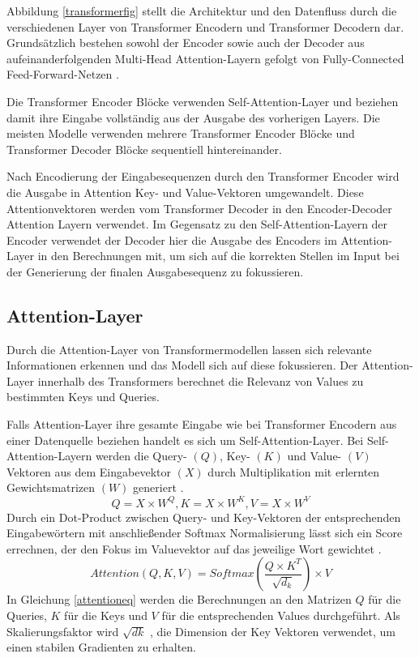 Abbildung \ref{transformerfig} stellt die Architektur und den Datenfluss durch die verschiedenen Layer von Transformer Encodern und Transformer Decodern dar. 
Grundsätzlich bestehen sowohl der Encoder sowie auch der Decoder aus aufeinanderfolgenden Multi-Head Attention-Layern gefolgt von Fully-Connected Feed-Forward-Netzen \citep{AttentionIALYN}.


Die Transformer Encoder Blöcke verwenden Self-Attention-Layer und beziehen damit ihre Eingabe vollständig aus der Ausgabe des vorherigen Layers. 
Die meisten Modelle verwenden mehrere Transformer Encoder Blöcke und Transformer Decoder Blöcke sequentiell hintereinander.

Nach Encodierung der Eingabesequenzen durch den Transformer Encoder wird die Ausgabe in Attention Key- und Value-Vektoren umgewandelt.
Diese Attentionvektoren werden vom Transformer Decoder in den Encoder-Decoder Attention Layern verwendet.
Im Gegensatz zu den Self-Attention-Layern der Encoder verwendet der Decoder hier die Ausgabe des Encoders im Attention-Layer in den Berechnungen mit, um sich auf die korrekten Stellen im Input bei der Generierung der finalen Ausgabesequenz zu fokussieren.






\subsection{Attention-Layer} %
\label{attention}
Durch die Attention-Layer von Transformermodellen lassen sich relevante Informationen erkennen und das Modell sich auf diese fokussieren. 
Der Attention-Layer innerhalb des Transformers berechnet die Relevanz von Values zu bestimmten Keys und Queries. 

Falls Attention-Layer ihre gesamte Eingabe wie bei Transformer Encodern aus einer Datenquelle beziehen handelt es sich um Self-Attention-Layer.
Bei Self-Attention-Layern werden die Query- $(Q)$, Key- $(K)$ und Value- $(V)$ Vektoren aus dem Eingabevektor $(X)$ durch Multiplikation mit erlernten Gewichtsmatrizen $(W)$ generiert \citep{AttentionIALYN}. 
\begin{equation}
    Q = X \times W^{Q}, K = X \times W^{K}, V = X \times W^{V}
\end{equation}
Durch ein Dot-Product zwischen Query- und Key-Vektoren der entsprechenden Eingabewörtern mit anschließender Softmax Normalisierung lässt sich ein Score errechnen, der den Fokus im Valuevektor auf das jeweilige Wort gewichtet \citep{AttentionIALYN}.
\begin{equation}
    \label{attentioneq}
    Attention(Q,K,V) = Softmax(\frac{Q\times K^T}{\sqrt{d_k}})\times V
\end{equation}
In Gleichung \ref{attentioneq} werden die Berechnungen an den Matrizen $Q$ für die Queries, $K$ für die Keys und $V$ für die entsprechenden Values durchgeführt. Als Skalierungsfaktor wird $\sqrt{dk}$ , die Dimension der Key Vektoren verwendet, um einen stabilen Gradienten zu erhalten. 

